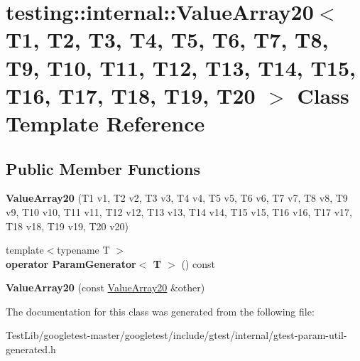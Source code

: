 \hypertarget{classtesting_1_1internal_1_1ValueArray20}{}\section{testing\+:\+:internal\+:\+:Value\+Array20$<$ T1, T2, T3, T4, T5, T6, T7, T8, T9, T10, T11, T12, T13, T14, T15, T16, T17, T18, T19, T20 $>$ Class Template Reference}
\label{classtesting_1_1internal_1_1ValueArray20}
\subsection*{Public Member Functions}
\begin{DoxyCompactItemize}
\item 
\mbox{\label{classtesting_1_1internal_1_1ValueArray20_aafa49e909db9556cdb89692976e80c4a}} 
{\bfseries Value\+Array20} (T1 v1, T2 v2, T3 v3, T4 v4, T5 v5, T6 v6, T7 v7, T8 v8, T9 v9, T10 v10, T11 v11, T12 v12, T13 v13, T14 v14, T15 v15, T16 v16, T17 v17, T18 v18, T19 v19, T20 v20)
\item 
\mbox{\label{classtesting_1_1internal_1_1ValueArray20_abcf63e97d31f62868dab49f1667e9d4f}} 
{\footnotesize template$<$typename T $>$ }\\{\bfseries operator Param\+Generator$<$ T $>$} () const
\item 
\mbox{\label{classtesting_1_1internal_1_1ValueArray20_a965099028a2057212ba388b8017f8e68}} 
{\bfseries Value\+Array20} (const \hyperlink{classtesting_1_1internal_1_1ValueArray20}{Value\+Array20} \&other)
\end{DoxyCompactItemize}


The documentation for this class was generated from the following file\+:\begin{DoxyCompactItemize}
\item 
Test\+Lib/googletest-\/master/googletest/include/gtest/internal/gtest-\/param-\/util-\/generated.\+h\end{DoxyCompactItemize}
